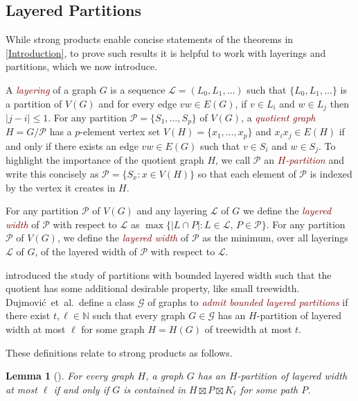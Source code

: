 \documentclass{patmorin}
\theoremstyle{plain}
\newtheorem{lem}[thm]{Lemma}
\theoremstyle{definition}
\newcommand{\defin}[1]{\textcolor{Maroon}{\emph{#1}}}
\newcommand{\PP}{\mathcal{P}}
\renewcommand{\leq}{\leqslant}
\begin{document}
\subsection{Layered Partitions}
\label{LayeredPartitions}

While strong products enable concise statements of the theorems in \cref{Introduction}, to prove such results it is helpful to work with layerings and partitions, which we now introduce.

A \defin{layering} of a graph $G$ is a sequence $\mathcal{L}=(L_0,L_1,\ldots)$ such that $\{L_0,L_1,\ldots\}$ is a partition of $V(G)$ and for every edge $vw\in E(G)$, if $v\in L_i$ and $w\in L_j$ then $|j-i|\leq 1$.  For any partition $\PP=\{S_1,\ldots,S_p\}$ of $V(G)$, a \defin{quotient graph} $H=G/\PP$ has a $p$-element vertex set $V(H)=\{x_1,\ldots,x_p\}$ and $x_ix_j\in E(H)$ if and only if there exists an edge $vw\in E(G)$ such that $v\in S_i$ and $w\in S_j$. To highlight the importance of the quotient graph $H$, we call $\PP$ an \defin{$H$-partition} and write this concisely as $\PP=\{S_x : x\in V(H)\}$ so that each element of $\PP$ is indexed by the vertex it creates in $H$.

For any partition $\PP$ of $V(G)$ and any layering $\mathcal{L}$ of $G$ we define the \defin{layered width} of $\PP$ with respect to $\mathcal{L}$ as $\max\{|L\cap P|: L\in\mathcal{L},\, P\in\PP\}$.  For any partition $\PP$ of $V(G)$, we define the \defin{layered width} of $\PP$ as the minimum, over all layerings $\mathcal{L}$ of $G$, of the layered width of $\PP$ with respect to $\mathcal{L}$.

\citet{DJMMUW20} introduced the study of partitions with bounded layered width such that the quotient has some additional desirable property, like small treewidth. Dujmovi\'c~et~al.\ define a class $\mathcal{G}$ of graphs to \defin{admit bounded layered partitions} if there exist $t,\ell\in\mathbb{N}$ such that every graph $G\in \mathcal{G}$ has an $H$-partition of layered width at most $\ell$ for some graph $H=H(G)$ of treewidth at most $t$.

These definitions relate to strong products as follows.

\begin{lem}[\citep{DJMMUW20}]
\label{PartitionProduct}
For every graph $H$, a graph $G$ has an $H$-partition of layered width at most $\ell$ if and only if $G$ is contained in $H \boxtimes P \boxtimes K_\ell$ for some path $P$.
\end{lem}
\end{document}
